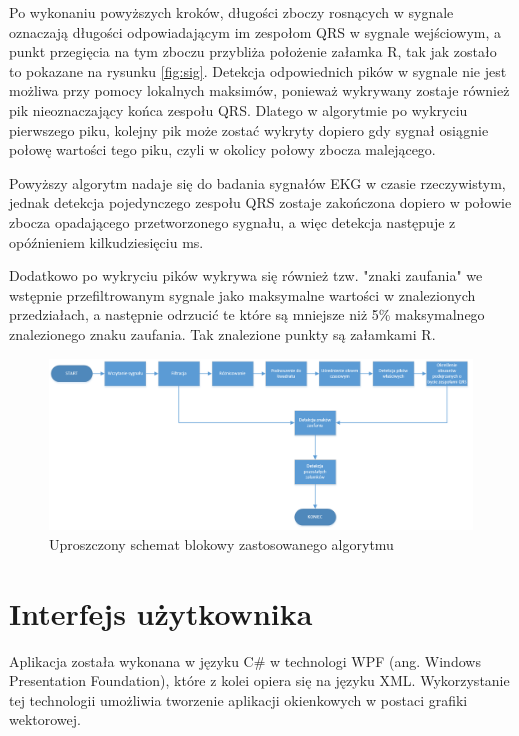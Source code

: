 \documentclass[11pt]{report}
\begin{document}
	Po wykonaniu powyższych kroków, długości zboczy rosnących w sygnale oznaczają długości odpowiadającym im zespołom QRS w sygnale wejściowym, a punkt przegięcia na tym zboczu przybliża położenie załamka R, tak jak zostało to pokazane na rysunku \ref{fig:sig}. Detekcja odpowiednich pików w sygnale nie jest możliwa przy pomocy lokalnych maksimów, ponieważ wykrywany zostaje również pik nieoznaczający końca zespołu QRS. Dlatego w algorytmie po wykryciu pierwszego piku, kolejny pik może zostać wykryty dopiero gdy sygnał osiągnie połowę wartości tego piku, czyli w  okolicy połowy zbocza malejącego.
	
	Powyższy algorytm nadaje się do badania sygnałów EKG w czasie rzeczywistym, jednak detekcja pojedynczego zespołu QRS zostaje zakończona dopiero w połowie zbocza opadającego przetworzonego sygnału, a więc detekcja następuje z opóźnieniem kilkudziesięciu ms.
	
	Dodatkowo po wykryciu pików wykrywa się również tzw. "znaki zaufania" we wstępnie przefiltrowanym sygnale jako maksymalne wartości w znalezionych przedziałach, a następnie odrzucić te które są mniejsze niż 5\% maksymalnego znalezionego znaku zaufania. Tak znalezione punkty są załamkami R.
	
	\begin{figure} [H]
		\centering
		\includegraphics[width=1\linewidth]{algorytm.png}
		\caption{Uproszczony schemat blokowy zastosowanego algorytmu}
		\label{fig:algorytm}
	\end{figure}
	\vspace{2cm}
	
	\chapter{Interfejs użytkownika}
	Aplikacja została wykonana w języku C\# w technologi WPF (ang. Windows Presentation Foundation), które z kolei opiera się na języku XML. Wykorzystanie tej technologii umożliwia tworzenie aplikacji okienkowych w postaci grafiki wektorowej.\newline
	
\end{document}
